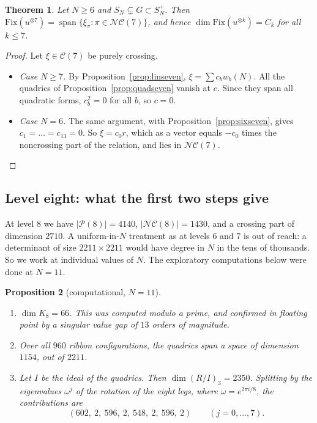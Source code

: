 \documentclass[11pt]{amsart}
\newtheorem{theorem}{Theorem}[section]
\newtheorem{proposition}[theorem]{Proposition}
\theoremstyle{definition}
\theoremstyle{remark}
\theoremstyle{plain}
\numberwithin{equation}{section}
\numberwithin{table}{section}
\newcommand{\Fix}{\mathrm{Fix}}
\newcommand{\NC}{\mathcal{NC}}
\newcommand{\Pp}{\mathcal{P}}
\DeclareMathOperator{\spn}{span}
\begin{document}
\begin{theorem}\label{thm:levelseven}
Let $N\ge6$ and $S_N\subsetneq G\subset S_N^+$. Then $\Fix(u^{\otimes7})=\spn\{\xi_\pi:\pi\in\NC(7)\}$, and hence $\dim\Fix(u^{\otimes k})=C_k$ for all $k\le7$.
\end{theorem}

\begin{proof}
Let $\xi\in\mathcal C(7)$ be purely crossing.
\begin{itemize}
\item \emph{Case $N\ge7$.} By Proposition~\ref{prop:linseven}, $\xi=\sum c_bw_b(N)$. All the quadrics of Proposition~\ref{prop:quadseven} vanish at $c$. Since they span all quadratic forms, $c_b^2=0$ for all $b$, so $c=0$.
\item \emph{Case $N=6$.} The same argument, with Proposition~\ref{prop:sixseven}, gives $c_1=\dots=c_{13}=0$. So $\xi=c_0r$, which as a vector equals $-c_0$ times the noncrossing part of the relation, and lies in $\NC(7)$. \qedhere
\end{itemize}
\end{proof}

\subsection{Level eight: what the first two steps give}

At level $8$ we have $|\Pp(8)|=4140$, $|\NC(8)|=1430$, and a crossing part of dimension $2710$. A uniform-in-$N$ treatment as at levels $6$ and $7$ is out of reach: a determinant of size $2211\times2211$ would have degree in $N$ in the tens of thousands. So we work at individual values of $N$. The exploratory computations below were done at $N=11$.

\begin{proposition}[computational, $N=11$]\label{prop:eight}
\begin{enumerate}
\item $\dim K_8=66$. This was computed modulo a prime, and confirmed in floating point by a singular value gap of $13$ orders of magnitude.
\item Over all $960$ ribbon configurations, the quadrics span a space of dimension $1154$, out of $2211$.
\item Let $I$ be the ideal of the quadrics. Then $\dim(R/I)_3=2350$. Splitting by the eigenvalues $\omega^j$ of the rotation of the eight legs, where $\omega=e^{2\pi i/8}$, the contributions are
\[
(602,\ 2,\ 596,\ 2,\ 548,\ 2,\ 596,\ 2)\qquad(j=0,\dots,7).
\]
\end{enumerate}
\end{proposition}
\end{document}
